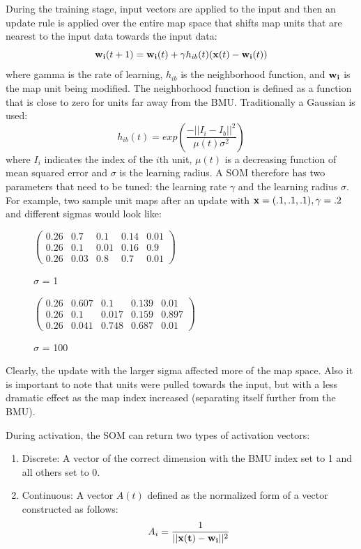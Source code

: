 \documentclass[a4paper,10pt]{article}
\begin{document}
During the training stage, input vectors are applied to the input and then an
update rule is applied over the entire map space that shifts map units that are nearest to the
input data towards the input data:
\begin{equation} \label{eq:UPDATE}
 \bold{w_{i}}(t+1) = \bold{w_i}(t) + \gamma h_{ib}(t)(\bold{x}(t)-\bold{w_i}(t))
\end{equation}
where gamma is the rate of learning, $h_{ib}$ is the neighborhood function, and $\bold{w_i}$ is the
map unit being modified.  The neighborhood function is defined as a function that is close to zero
for units far away from the BMU.  Traditionally a Gaussian is used:
\begin{equation} \label{eq:GAUSSIAN}
 h_{ib}(t) = exp(\frac{-||I_i-I_b||^2}{\mu(t)\sigma^2})
\end{equation}
where $I_i$ indicates the index of the $i$th unit, $\mu(t)$ is a decreasing function of mean
squared error and $\sigma$ is the learning radius.  A SOM therefore has two parameters that need to
be tuned: the learning rate $\gamma$ and the learning radius $\sigma$. For example, two sample unit
maps after an update with $\bold{x}=(.1,.1,.1), \gamma=.2$ and different sigmas would look like:
\begin{figure}[h]
\begin{center}
$
\begin{pmatrix}
0.26 &  0.7 &  0.1 &  0.14  & 0.01 \\
0.26  & 0.1  & 0.01 & 0.16 & 0.9  \\
0.26  & 0.03 & 0.8  & 0.7  & 0.01
\end{pmatrix}$
\caption{$\sigma$ = 1}
\centering
$\begin{pmatrix}
0.26 &  0.607 &  0.1 &  0.139  & 0.01 \\
0.26  & 0.1  & 0.017 & 0.159 & 0.897  \\
0.26  & 0.041 & 0.748  & 0.687  & 0.01
\end{pmatrix}
$
\caption{$\sigma$ = 100}
\end{center}
\end{figure}
Clearly, the update with the larger sigma affected more of the map space.  Also it is important to
note that units were pulled towards the input, but with a less dramatic effect as the map index
increased (separating itself further from the BMU).

During activation, the SOM can return two types of activation vectors:
\begin{enumerate}
\item Discrete: A vector of the correct dimension with the BMU index set to 1 and all others set
to 0.
\item Continuous: A vector $A(t)$ defined as the normalized form of a vector constructed as follows:
\begin{equation}
 A_i = \frac{1}{||\bold{x(t)} - \bold{w_i}||^2}
\end{equation}
\end{enumerate}
\end{document}
